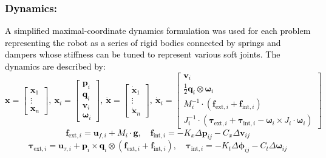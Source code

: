 \documentclass[runningheads]{llncs}
\newcommand{\changes}[1]{\textcolor{black}{#1}}
\begin{document}
\changes{\subsubsection{Dynamics:} A simplified maximal-coordinate dynamics formulation was used for each problem representing the robot as a series of rigid bodies connected by springs and dampers whose stiffness can be tuned to represent various soft joints. The dynamics are described by:
\begin{equation}
\textbf{x} = \begin{bmatrix}
    \textbf{x}_1 \\
    \vdots \\
    \textbf{x}_n
\end{bmatrix}, \ \textbf{x}_i = \begin{bmatrix}
    \textbf{p}_i \\ \textbf{q}_i \\ \textbf{v}_i \\ \boldsymbol{\omega}_i
\end{bmatrix}, \ \dot{\textbf{x}} = \begin{bmatrix}
    \dot{\textbf{x}}_1 \\ 
    \vdots \\ 
    \dot{\textbf{x}}_n
\end{bmatrix}, \ \dot{\textbf{x}}_i = \begin{bmatrix}
    {\textbf{v}}_i \\ \frac{1}{2}\textbf{q}_i \otimes \boldsymbol{\omega}_i \\ M_i^{-1} \cdot (\textbf{f}_{\text{ext}, i} + \textbf{f}_{\text{int}, i}) \\ J_i^{-1} \cdot (\boldsymbol{\tau}_{\text{ext}, i} + \boldsymbol{\tau}_{\text{int}, i} - \boldsymbol{\omega}_i \times J_i \cdot \boldsymbol{\omega}_i)
\end{bmatrix}  
\label{eq:space_struct1}
\end{equation}
\begin{equation}
     \textbf{f}_{\text{ext}, i} = \textbf{u}_{f,i} + M_i \cdot \textbf{g}, \quad \textbf{f}_{\text{int}, i} = -K_x \Delta \textbf{p}_{ij} - C_x \Delta \textbf{v}_{ij}
     \label{eq:space_struct2}
\end{equation}
\begin{equation}
    \boldsymbol{\tau}_{\text{ext}, i} = \textbf{u}_{\tau,i} + \textbf{p}_i \times \textbf{q}_i \otimes (\textbf{f}_{\text{ext}, i} + \textbf{f}_{\text{int}, i}), \quad \boldsymbol{\tau}_{\text{int}, i} = -K_t \Delta \boldsymbol{\phi}_{ij} - C_t \Delta \boldsymbol{\omega}_{ij} 

\end{equation}}
\end{document}

